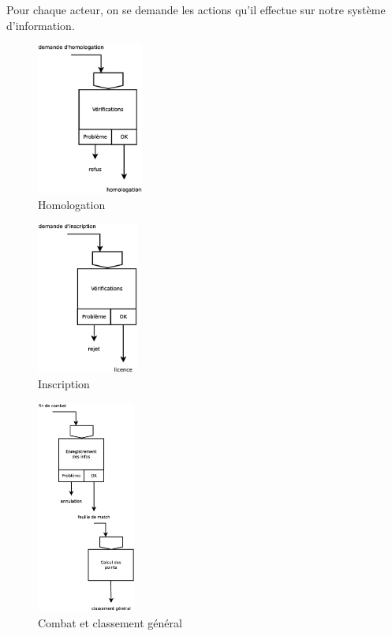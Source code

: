 Pour chaque acteur, on se demande les actions qu'il effectue sur notre système d'information.

\begin{figure}[!htb]
    \begin{center}
    \includegraphics[height=5cm]{images/cc2_mct1.eps}
    \caption{\label{cc2_mct1} Homologation}
    \end{center}
\end{figure}

\begin{figure}[!htb]
    \begin{center}
    \includegraphics[height=5cm]{images/cc2_mct2.eps}
    \caption{\label{cc2_mct2} Inscription}
    \end{center}
\end{figure}

\begin{figure}[!htb]
    \begin{center}
    \includegraphics[height=7cm]{images/cc2_mct3.eps}
    \caption{\label{cc2_mct3} Combat et classement général}
    \end{center}
\end{figure}

